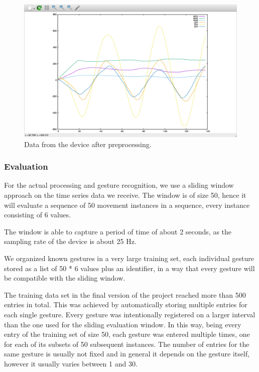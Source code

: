 \begin{figure}[h]
\centering
\includegraphics[width=1\columnwidth]{img/20}
\caption{Data from the device after preprocessing.}
\label{fig:figure3}
\end{figure}

\subsubsection{Evaluation}
For the actual processing and gesture recognition, we use a sliding window approach on the time series data we receive.
The window is of size 50, hence it will evaluate a sequence of 50 movement instances in a sequence,
every instance consisting of 6 values.

The window is able to capture a period of time of about 2 seconds, as the sampling rate of the device is about 25 Hz.

We organized known gestures in a very large training set, each individual gesture stored as a list of 50 * 6 values plus an identifier, in a way that every gesture will be compatible with the sliding window. 

The training data set in the final version of the project reached more than 500 entries in total.
This was achieved by automatically storing multiple entries for each single gesture.
Every gesture was intentionally registered on a larger interval than the one used for the sliding evaluation window.
In this way, being every entry of the training set of size 50,  each gesture was entered multiple times, one for each of its subsets of 50 subsequent instances.
The number of entries for the same gesture is usually not fixed and in general it depends on the gesture itself, however it usually varies between 1 and 30.

